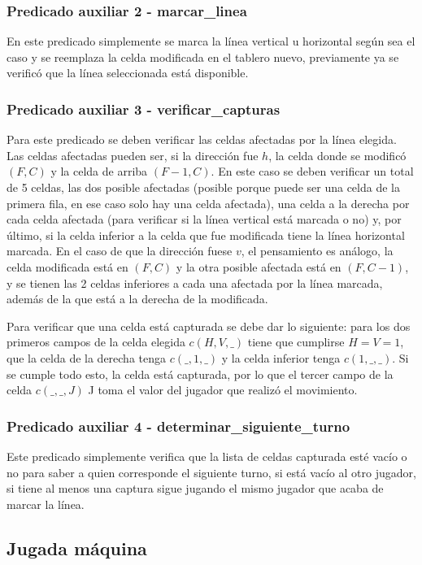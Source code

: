 \documentclass[12pt]{article} %
\begin{document}
			\subsubsection{Predicado auxiliar 2 - marcar\_linea}
			En este predicado simplemente se marca la línea vertical u horizontal según sea el caso y se reemplaza la celda modificada en el tablero nuevo, previamente ya se verificó que la línea seleccionada está disponible.
			
			\subsubsection{Predicado auxiliar 3 - verificar\_capturas}
			Para este predicado se deben verificar las celdas afectadas por la línea elegida. Las celdas afectadas pueden ser, si la dirección fue $h$, la celda donde se modificó $(F,C)$ y la celda de arriba $(F-1,C)$. En este caso se deben verificar un total de 5 celdas, las dos posible afectadas (posible porque puede ser una celda de la primera fila, en ese caso solo hay una celda afectada), una celda a la derecha por cada celda afectada (para verificar si la línea vertical está marcada o no) y, por último, si la celda inferior a la celda que fue modificada tiene la línea horizontal marcada. En el caso de que la dirección fuese $v$, el pensamiento es análogo, la celda modificada está en $(F,C)$ y la otra posible afectada está en $(F, C-1)$, y se tienen las 2 celdas inferiores a cada una afectada por la línea marcada, además de la que está a la derecha de la modificada.
			
			Para verificar que una celda está capturada se debe dar lo siguiente: para los dos primeros campos de la celda elegida $c(H,V,\_)$ tiene que cumplirse $H=V=1$, que la celda de la derecha tenga $c(\_,1,\_)$ y la celda inferior tenga $c(1,\_,\_)$. Si se cumple todo esto, la celda está capturada, por lo que el tercer campo de la celda $c(\_,\_,J)$ J toma el valor del jugador que realizó el movimiento.
			
			\subsubsection{Predicado auxiliar 4 - determinar\_siguiente\_turno}
			Este predicado simplemente verifica que la lista de celdas capturada esté vacío o no para saber a quien corresponde el siguiente turno, si está vacío al otro jugador, si tiene al menos una captura sigue jugando el mismo jugador que acaba de marcar la línea.
			
		\subsection{Jugada máquina}
		
		
	
\end{document}
